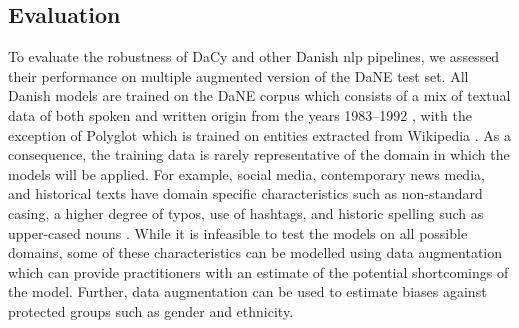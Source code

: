 \documentclass{article}
\begin{document}
\begin{table}
\caption{\label{tab:dacy-perf}Performance of models finetuned for DaCy. Highest scores are in bold and second highest is underlined. WPS indicates words pr. second.}
\centering
{}
\end{table}  
\subsection{Evaluation}\label{sec:experiments}
To evaluate the robustness of DaCy and other Danish \gls{nlp} pipelines, we assessed their performance on multiple augmented version of the DaNE test set. All Danish models are trained on the DaNE corpus which consists of a mix of textual data of both spoken and written origin from the years 1983–1992 \parencite{hvingelby_dane_2020}, with the exception of Polyglot which is trained on entities extracted from Wikipedia \parencite{al-rfou_polyglot_2013}. As a consequence, the training data is rarely representative of the domain in which the models will be applied. For example, social media, contemporary news media, and historical texts have domain specific characteristics such as non-standard casing, a higher degree of typos, use of hashtags, and historic spelling such as upper-cased nouns \parencite{tahmasebi_study_2018, baldwin_social_2012, farzindar_natural_2015}. While it is infeasible to test the models on all possible domains, some of these characteristics can be modelled using data augmentation which can provide practitioners with an estimate of the potential shortcomings of the model. Further, data augmentation can be used to estimate biases against protected groups such as gender and ethnicity.
\end{document}
